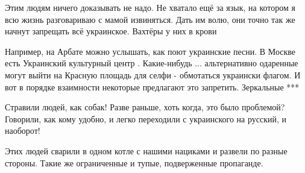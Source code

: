 \begin{itemize}
 

Этим людям ничего доказывать не надо. Не хватало ещё за язык, на котором я всю
жизнь разговариваю с мамой извиняться. Дать им волю, они точно так же начнут
запрещать всё украинское. Вахтёры у них в крови

\begin{itemize}
 

Например, на Арбате можно услышать, как поют украинские песни. В Москве есть
Украинский культурный центр . Какие-нибудь ... альтернативно одаренные могут
выйти на Красную площадь для селфи - обмотаться украински флагом. И вот в
порядке взаимности некоторые предлагают это запретить. Зеркальные ***

\end{itemize}

 

Стравили людей, как собак! Разве раньше, хоть когда, это было проблемой?
Говорили, как кому удобно, и легко переходили с украинского на русский, и
наоборот!


 

Этих людей сварили в одном котле с нашими нациками и развели по разные стороны.
Такие же ограниченные и тупые, подверженные пропаганде.


 


\end{itemize}
